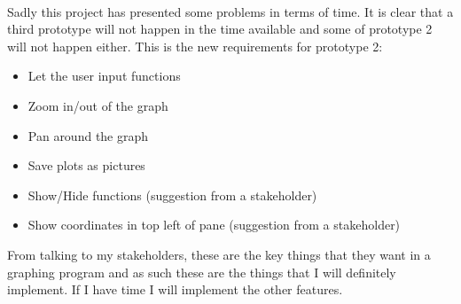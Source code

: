 \documentclass[../../../main.tex]{subfiles}
\begin{document}
\\
Sadly this project has presented some problems in terms of time. It is clear that a third prototype will not happen in the time available and some of prototype 2 will not happen either. This is the new requirements for prototype 2:
\begin{itemize}
	\item Let the user input functions
	\item Zoom in/out of the graph
	\item Pan around the graph
	\item Save plots as pictures
	\item Show/Hide functions (suggestion from a stakeholder)
	\item Show coordinates in top left of pane (suggestion from a stakeholder)
\end{itemize}
From talking to my stakeholders, these are the key things that they want in a graphing program and as such these are the things that I will definitely implement. If I have time I will implement the other features.
\newpage
\end{document}
